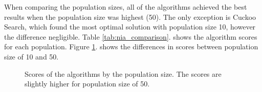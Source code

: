 \documentclass[runningheads]{llncs}
\begin{document}
When comparing the population sizes, all of the algorithms achieved the best results when the population size was highest (50). The only exception is Cuckoo Search, which found the most optimal solution with population size 10, however the difference negligible. Table \ref{tab:nia_comparison}. shows the algorithm scores for each population. Figure \ref{fig:nia_train_score_by_algorithm}. shows the differences in scores between population size of 10 and 50.

\begin{figure}
    \centering
    \qquad
    \caption{Scores of the algorithms by the population size. The scores are slightly higher for population size of 50.}
    \label{fig:nia_train_score_by_algorithm}
\end{figure}
\end{document}
